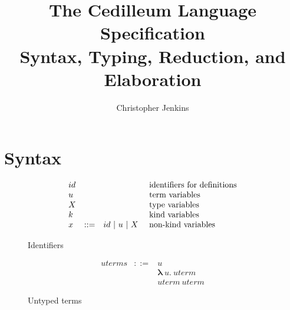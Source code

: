 \documentclass{article}
\begin{document}
\title{The Cedilleum Language Specification \\ \large Syntax, Typing, Reduction,
  and Elaboration }

\author{Christopher Jenkins}

\maketitle

\section{Syntax}

\begin{figure}[h]
  \[
    \begin{array}{llll}
      id & &
      & \textnormal{identifiers for definitions}
      \\ u & &
      & \textnormal{term variables}
      \\ X & &
      & \textnormal{type variables}
      \\ k & &
      & \textnormal{kind variables}
      \\ x & ::= & id\ |\ u\ |\ X\
      & \textnormal{non-kind variables}
    \end{array}
  \]
  \caption{Identifiers}
\end{figure}

\begin{figure}[h]
  \[
    \begin{array}{llll}
      uterms
      & ::= & u
      \\ & & \textbf{λ}\ u \textbf{.}\ uterm
      \\ & & uterm\ uterm
    \end{array}
  \]
  \caption{Untyped terms}
\end{figure}
\end{document}

